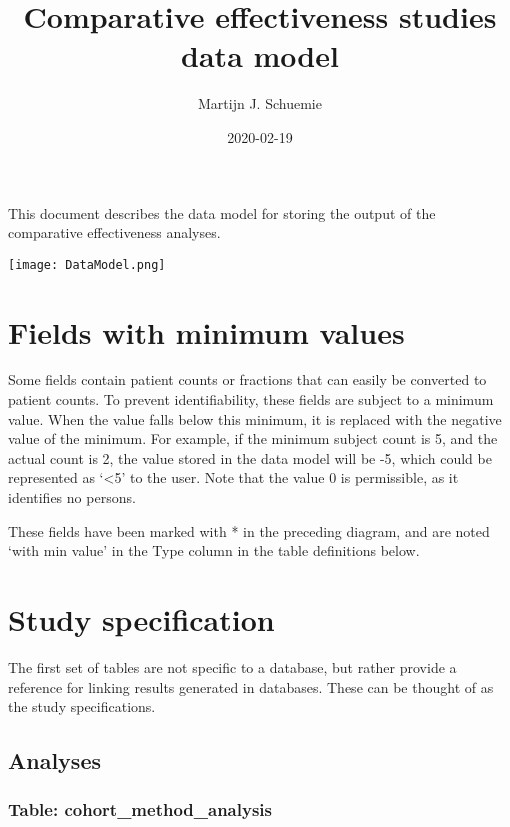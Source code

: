\documentclass[
]{article}
\title{Comparative effectiveness studies data model}
\author{Martijn J. Schuemie}
\date{2020-02-19}
\begin{document}
\maketitle

{
\setcounter{tocdepth}{2}
\tableofcontents
}
This document describes the data model for storing the output of the
comparative effectiveness analyses.

\texttt{[image: DataModel.png]}

\hypertarget{fields-with-minimum-values}{%
\section{Fields with minimum values}\label{fields-with-minimum-values}}

Some fields contain patient counts or fractions that can easily be
converted to patient counts. To prevent identifiability, these fields
are subject to a minimum value. When the value falls below this minimum,
it is replaced with the negative value of the minimum. For example, if
the minimum subject count is 5, and the actual count is 2, the value
stored in the data model will be -5, which could be represented as
`\textless5' to the user. Note that the value 0 is permissible, as it
identifies no persons.

These fields have been marked with * in the preceding diagram, and are
noted `with min value' in the Type column in the table definitions
below.

\hypertarget{study-specification}{%
\section{Study specification}\label{study-specification}}

The first set of tables are not specific to a database, but rather
provide a reference for linking results generated in databases. These
can be thought of as the study specifications.

\hypertarget{analyses}{%
\subsection{Analyses}\label{analyses}}

\hypertarget{table-cohort_method_analysis}{%
\subsubsection{Table:
cohort\_method\_analysis}\label{table-cohort_method_analysis}}
\end{document}
